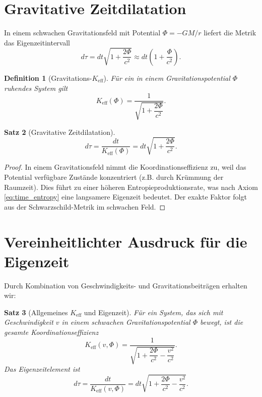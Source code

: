 \documentclass[12pt,a4paper]{article}
\newtheorem{theorem}{Satz}[section]
\newtheorem{definition}[theorem]{Definition}
\newcommand{\Keff}{K_{\mathrm{eff}}}
\begin{document}
	\section{Gravitative Zeitdilatation}
	\label{sec:gr}
	
	In einem schwachen Gravitationsfeld mit Potential \(\Phi = -GM/r\) liefert die Metrik das Eigenzeitintervall
	\begin{equation}
		d\tau = dt\sqrt{1 + \frac{2\Phi}{c^2}} \approx dt\left(1 + \frac{\Phi}{c^2}\right).
	\end{equation}
	
	\begin{definition}[Gravitations-\(\Keff\)]
		Für ein in einem Gravitationspotential \(\Phi\) ruhendes System gilt
		\[
		\Keff(\Phi) = \frac{1}{\sqrt{1 + \dfrac{2\Phi}{c^2}}}.
		\]
	\end{definition}
	
	\begin{theorem}[Gravitative Zeitdilatation]
		\begin{equation}
			d\tau = \frac{dt}{\Keff(\Phi)} = dt\sqrt{1 + \frac{2\Phi}{c^2}}.
		\end{equation}
	\end{theorem}
	
	\begin{proof}
		In einem Gravitationsfeld nimmt die Koordinationseffizienz zu, weil das Potential verfügbare Zustände konzentriert (z.B. durch Krümmung der Raumzeit). Dies führt zu einer höheren Entropieproduktionsrate, was nach Axiom \ref{eq:time_entropy} eine langsamere Eigenzeit bedeutet. Der exakte Faktor folgt aus der Schwarzschild-Metrik im schwachen Feld.
	\end{proof}
	
	\section{Vereinheitlichter Ausdruck für die Eigenzeit}
	\label{sec:unified}
	
	Durch Kombination von Geschwindigkeits- und Gravitationsbeiträgen erhalten wir:
	
	\begin{theorem}[Allgemeines \(\Keff\) und Eigenzeit]
		Für ein System, das sich mit Geschwindigkeit \(v\) in einem schwachen Gravitationspotential \(\Phi\) bewegt, ist die gesamte Koordinationseffizienz
		\begin{equation}
			\Keff(v,\Phi) = \frac{1}{\sqrt{1 + \dfrac{2\Phi}{c^2} - \dfrac{v^2}{c^2}}}.
		\end{equation}
		Das Eigenzeitelement ist
		\begin{equation}
			d\tau = \frac{dt}{\Keff(v,\Phi)} = dt\sqrt{1 + \frac{2\Phi}{c^2} - \frac{v^2}{c^2}}.
		\end{equation}
	\end{theorem}
	
\end{document}
